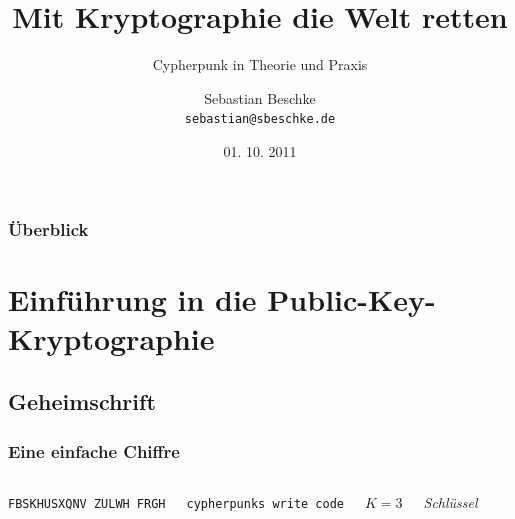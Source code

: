 \documentclass{beamer}
\title{Mit Kryptographie die Welt retten}
\subtitle{Cypherpunk in Theorie und Praxis}
\author{Sebastian Beschke \\ \texttt{sebastian@sbeschke.de}}
\institute{Chaostreff Tübingen}
\date{01. 10. 2011}
\begin{document}
\begin{frame}
\titlepage
\end{frame}


\begin{frame}
	\frametitle{Überblick}
	\tableofcontents
\end{frame}

\section{Einführung in die Public-Key-Kryptographie}
\subsection{Geheimschrift}

\begin{frame}
\frametitle{Eine einfache Chiffre}
\begin{columns}

	\texttt{FBSKHUSXQNV ZULWH FRGH}

\pause	\texttt{cypherpunks write code}

\pause	\(K=3\)

	\textit{Schlüssel}

\end{columns}
\end{frame}
\end{document}
